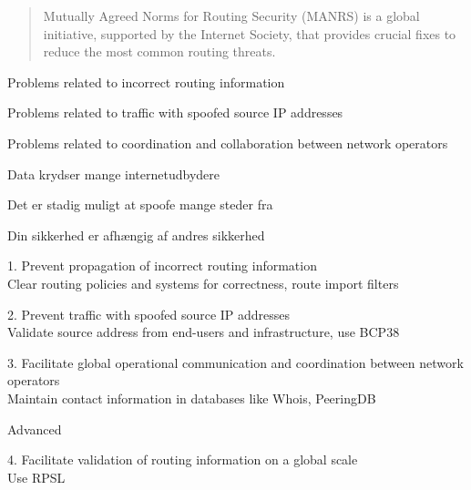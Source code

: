 \documentclass[Screen16to9,17pt]{foils}
\begin{document}


\begin{quote}
  Mutually Agreed Norms for Routing Security (MANRS) is a global initiative, supported by the Internet Society, that provides crucial fixes to reduce the most common routing threats. ﻿
\end{quote}

\begin{list1}
\item Problems related to incorrect routing information
\item Problems related to traffic with spoofed source IP addresses
\item Problems related to coordination and collaboration between network operators
\item {\small{}}
\item {\small{}}
\end{list1}




\begin{list2}
\item Data krydser mange internetudbydere
\item Det er stadig muligt at spoofe mange steder fra
\item Din sikkerhed er afhængig af andres sikkerhed
\end{list2}


\begin{list1}
\item 1. Prevent propagation of incorrect routing information\\
Clear routing policies and systems for correctness, route import filters
\item 2. Prevent traffic with spoofed source IP addresses\\
Validate source address from end-users and infrastructure, use BCP38
\item 3. Facilitate global operational communication and coordination between network operators\\
Maintain contact information in databases like Whois, PeeringDB
{\small{}}

\item Advanced
\item 4. Facilitate validation of routing information on a global scale\\
Use RPSL {\small{}}
\end{list1}
\end{document}
